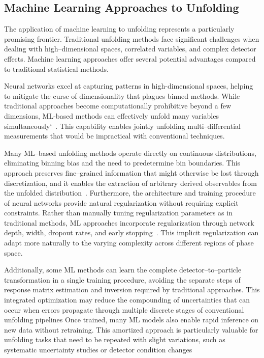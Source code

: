 \subsection{Machine Learning Approaches to Unfolding}

The application of machine learning to unfolding represents a particularly promising frontier.
%
Traditional unfolding methods face significant challenges when dealing with high--dimensional spaces, correlated variables, and complex detector effects.
%
Machine learning approaches offer several potential advantages compared to traditional statistical methods.

Neural networks excel at capturing patterns in high-dimensional spaces, helping to mitigate the curse of dimensionality that plagues binned methods.
%
While traditional approaches become computationally prohibitive beyond a few dimensions, ML-based methods can effectively unfold many variables simultaneously`~\cite{komiske_preserving_2021}.
%
This capability enables jointly unfolding multi--differential measurements that would be impractical with conventional techniques.

Many ML--based unfolding methods operate directly on continuous distributions, eliminating binning bias and the need to predetermine bin boundaries.
%
This approach preserves fine--grained information that might otherwise be lost through discretization, and it enables the extraction of arbitrary derived observables from the unfolded distribution~\cite{Shmakov2025FullDiffusion}.
%
Furthermore, the architecture and training procedure of neural networks provide natural regularization without requiring explicit constraints.
%
Rather than manually tuning regularization parameters as in traditional methods, ML approaches incorporate regularization through network depth, width, dropout rates, and early stopping~\cite{Girosi1995RegularizationArchitectures}.
%
This implicit regularization can adapt more naturally to the varying complexity across different regions of phase space.

Additionally, some ML methods can learn the complete detector--to--particle transformation in a single training procedure, avoiding the separate steps of response matrix estimation and inversion required by traditional approaches.
%
This integrated optimization may reduce the compounding of uncertainties that can occur when errors propagate through multiple discrete stages of conventional unfolding pipelines
%
Once trained, many ML models also enable rapid inference on new data without retraining.
%
This amortized approach is particularly valuable for unfolding tasks that need to be repeated with slight variations, such as systematic uncertainty studies or detector condition changes~\cite{Brehmer2020EffectiveLearning}

